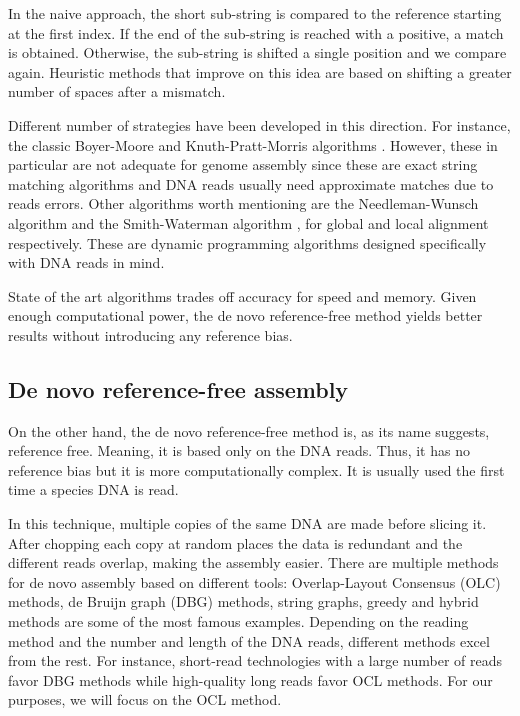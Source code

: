 In the naive approach, the short sub-string is compared to the reference starting at the first index. If the end of the sub-string is reached with a positive, a match is obtained. Otherwise, the sub-string is shifted a single position and we compare again. Heuristic methods that improve on this idea are based on shifting a greater number of spaces after a mismatch.

Different number of strategies have been developed in this direction. For instance, the classic Boyer-Moore and Knuth-Pratt-Morris algorithms \cite{Holmes1999}. However, these in particular are not adequate for genome assembly since these are exact string matching algorithms and DNA reads usually need approximate matches due to reads errors. Other algorithms worth mentioning are the Needleman-Wunsch algorithm \cite{Needleman1970} and the Smith-Waterman algorithm \cite{Smith1981}, for global and local alignment respectively. These are dynamic programming algorithms designed specifically with DNA reads in mind. 

State of the art algorithms trades off accuracy for speed and memory. Given enough computational power, the de novo reference-free method yields better results without introducing any reference bias.


\subsection{De novo reference-free assembly}


On the other hand, the de novo reference-free method is, as its name suggests, reference free. Meaning, it is based only on the DNA reads. Thus, it has no reference bias but it is more computationally complex. It is usually used the first time a species DNA is read.

In this technique, multiple copies of the same DNA are made before slicing it. After chopping each copy at random places the data is redundant and the different reads overlap, making the assembly easier. There are multiple methods for de novo assembly based on different tools: Overlap-Layout Consensus (OLC) methods, de Bruijn graph (DBG) methods, string graphs, greedy and hybrid methods are some of the most famous examples. Depending on the reading method and the number and length of the DNA reads, different methods excel from the rest. For instance, short-read technologies with a large number of reads favor DBG methods while high-quality long reads favor OCL methods. For our purposes, we will focus on the OCL method.

